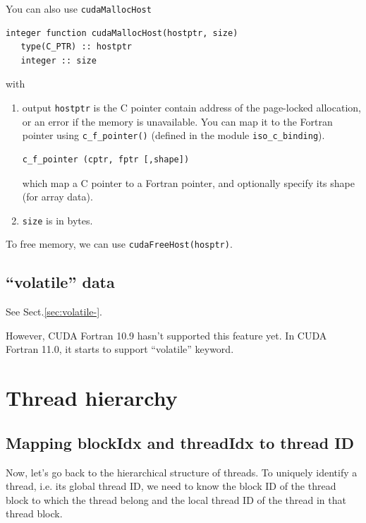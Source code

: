 You can also use \verb!cudaMallocHost!
\begin{lstlisting}
integer function cudaMallocHost(hostptr, size)
   type(C_PTR) :: hostptr
   integer :: size
\end{lstlisting}
with 
\begin{enumerate}
\item output \verb!hostptr! is the C pointer contain address of the
  page-locked allocation, or an error if the memory is
  unavailable. You can map it to the Fortran pointer using
  \verb!c_f_pointer()! (defined in the module \verb!iso_c_binding!). 
\begin{lstlisting}
c_f_pointer (cptr, fptr [,shape])
\end{lstlisting}
  which map a C pointer to a Fortran pointer, and optionally specify its
  shape (for array data). 

\item \verb!size! is in bytes.
\end{enumerate}
To free memory, we can use \verb!cudaFreeHost(hosptr)!. 

\subsection{``volatile'' data}
\label{sec:fcuda-volatile}

See Sect.\ref{sec:volatile-}.

\begin{framed}
However, CUDA Fortran 10.9 hasn't supported this feature yet. In CUDA Fortran
11.0, it starts to support ``volatile'' keyword. 
\end{framed}



\section{Thread hierarchy}
\label{sec:cudafortran_thread_hierarchy}
 
\subsection{Mapping blockIdx and threadIdx to thread ID}
\label{sec:mapp-block-thre}

Now, let's go back to the hierarchical structure of threads. To
uniquely identify a thread, i.e. its global thread ID, we need to know
the block ID of the thread block to which the thread belong and the
local thread ID of the thread in that thread block. 

